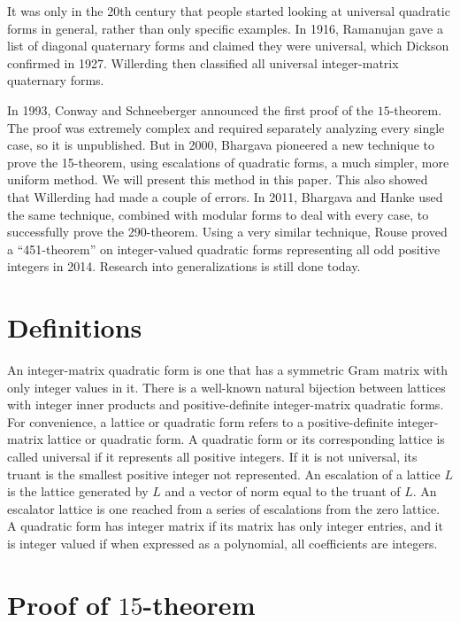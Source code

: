 \documentclass{article}
\begin{document}
It was only in the 20th century that people started looking at universal quadratic forms in general, rather than only specific examples. In 1916, Ramanujan gave a list of diagonal quaternary forms and claimed they were universal, which Dickson confirmed in 1927.
Willerding then classified all universal integer-matrix quaternary forms.

In 1993, Conway and Schneeberger announced the first proof of the $15$-theorem.
The proof was extremely complex and required separately analyzing every single case, so it is unpublished.
But in 2000, Bhargava \cite{fifteen} pioneered a new technique to prove the 15-theorem, using escalations of quadratic forms, a much simpler, more uniform method.  We will present this method in this paper. This also showed that Willerding had made a couple of errors.
In 2011, Bhargava and Hanke \cite{twoninety} used the same technique, combined with modular forms to deal with every case, to successfully prove the 290-theorem.
Using a very similar technique, Rouse proved a ``451-theorem'' on integer-valued quadratic forms representing all odd positive integers in 2014. Research into generalizations is still done today.

\section{Definitions}
An integer-matrix quadratic form is one that has a symmetric Gram matrix with only integer values in it. There is a well-known natural bijection between lattices with integer inner products and positive-definite integer-matrix quadratic forms. For convenience, a lattice or quadratic form refers to a positive-definite integer-matrix lattice or quadratic form. A quadratic form or its corresponding lattice is called universal if it represents all positive integers. If it is not universal, its truant is the smallest positive integer not represented. An escalation of a lattice $L$ is the lattice generated by $L$ and a vector of norm equal to the truant of $L$. An escalator lattice is one reached from a series of escalations from the zero lattice. A quadratic form has integer matrix if its matrix has only integer entries, and it is integer valued if when expressed as a polynomial, all coefficients are integers.

\section{Proof of $15$-theorem}
\end{document}
